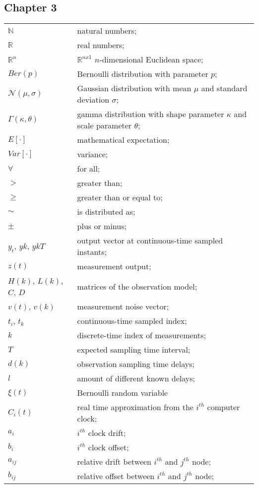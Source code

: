 \subsection*{Chapter 3}

\begin{longtable}{ll}
	$\mathbb{N}$			& natural numbers; \\
	$\mathbb{R}$			& real numbers; \\
	$\mathbb{R}^n$			& $\mathbb{R}^{nx1}$ $n$-dimensional Euclidean space; \\
	
	$Ber(p)$				& Bernoulli distribution with parameter $p$; \\
	$\mathcal{N}(\mu,\sigma)$ & Gaussian distribution with mean $\mu$ and standard deviation $\sigma$; \\
	$\Gamma(\kappa,\theta)$	& gamma distribution with shape parameter $\kappa$ and scale parameter $\theta$; \\
	$E[\mathord{\cdot}]$	& mathematical expectation; \\
	$Var[\mathord{\cdot}]$	& variance; \\
	
	$\forall$				& for all; \\
	$>$						& greater than; \\
	$\geq$					& greater than or equal to; \\
	$\sim$					& is distributed as; \\
	$\pm$					& plus or minus; \\
	
	$y_{t}$, $y{k}$, $y{kT}$& output vector at continuous-time sampled instants;\\
	$z(t)$					& measurement output; \\
	$H(k)$, $L(k)$, $C$, $D$& matrices of the observation model; \\
	$v(t)$, $v(k)$			& measurement noise vector; \\
	$t_i$, $t_k$			& continuous-time sampled index; \\
	$k$						& discrete-time index of measurements;  \\
	$T$						& expected sampling time interval; \\
	$d(k)$					& observation sampling time delays; \\
	$l$						& amount of different known delays; \\
	$\xi(t)$				& Bernoulli random variable \\
	$C_i(t)$				& real time approximation from the $i^{th}$ computer clock; \\
	$a_i$					& $i^{th}$ clock drift; \\
	$b_i$					& $i^{th}$ clock offset; \\
	$a_{ij}$				& relative drift between $i^{th}$ and $j^{th}$ node; \\
	$b_{ij}$				& relative offset between $i^{th}$ and $j^{th}$ node; \\


\end{longtable}
